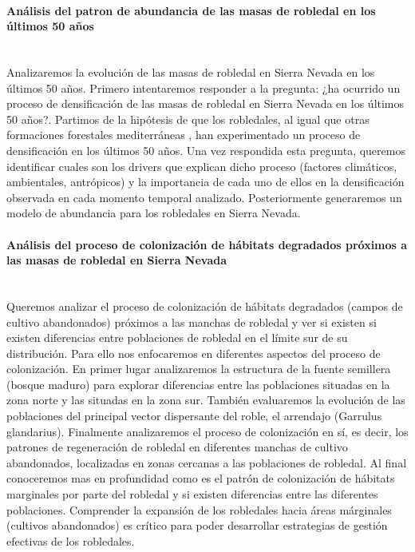 \paragraph{Análisis del patron de abundancia de las masas de robledal en los últimos 50 años} \mbox{} \\
Analizaremos la evolución de las masas de robledal en Sierra Nevada en los últimos 50 años. Primero intentaremos responder a la pregunta: ¿ha ocurrido un proceso de densificación de las masas de robledal en Sierra Nevada en los últimos 50 años?. Partimos de la hipótesis de que los robledales, al igual que otras formaciones forestales mediterráneas , han experimentado un proceso de densificación en los últimos 50 años. Una vez respondida esta pregunta, queremos identificar cuales son los drivers que explican dicho proceso (factores climáticos, ambientales, antrópicos) y la importancia de cada uno de ellos en la densificación observada en cada momento temporal analizado. Posteriormente generaremos un modelo de abundancia para los robledales en Sierra Nevada.

\paragraph{Análisis del proceso de colonización de hábitats degradados próximos a las masas de robledal en Sierra Nevada}\mbox{} \\
Queremos analizar el proceso de colonización de hábitats degradados (campos de cultivo abandonados) próximos a las manchas de robledal y ver si existen si existen diferencias entre poblaciones de robledal en el límite sur de su distribución. Para ello nos enfocaremos en diferentes aspectos del proceso de colonización. En primer lugar analizaremos la estructura de la fuente semillera (bosque maduro) para explorar diferencias entre las poblaciones situadas en la zona norte y las situadas en la zona sur. También evaluaremos la evolución de las poblaciones del principal vector dispersante del roble, el arrendajo (Garrulus glandarius). Finalmente analizaremos el proceso de colonización en sí, es decir, los patrones de regeneración de robledal en diferentes manchas de cultivo abandonados, localizadas en zonas cercanas a las poblaciones de robledal.
Al final conoceremos mas en profundidad como es el patrón de colonización de hábitats marginales por parte del robledal y si existen diferencias entre las diferentes poblaciones. Comprender la expansión de los robledales hacia áreas márginales (cultivos abandonados) es crítico para poder desarrollar estrategias de gestión efectivas de los robledales.

